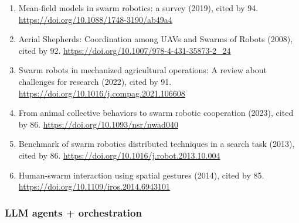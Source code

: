 \documentclass[
]{article}
\begin{document}
\begin{enumerate}
  Interaction with Foraging Swarms (2013), cited by 104.
  \url{https://doi.org/10.5898/jhri.2.2.kolling}
\item
  Mean-field models in swarm robotics: a survey (2019), cited by 94.
  \url{https://doi.org/10.1088/1748-3190/ab49a4}
\item
  Aerial Shepherds: Coordination among UAVs and Swarms of Robots (2008),
  cited by 92. \url{https://doi.org/10.1007/978-4-431-35873-2_24}
\item
  Swarm robots in mechanized agricultural operations: A review about
  challenges for research (2022), cited by 91.
  \url{https://doi.org/10.1016/j.compag.2021.106608}
\item
  From animal collective behaviors to swarm robotic cooperation (2023),
  cited by 86. \url{https://doi.org/10.1093/nsr/nwad040}
\item
  Benchmark of swarm robotics distributed techniques in a search task
  (2013), cited by 86. \url{https://doi.org/10.1016/j.robot.2013.10.004}
\item
  Human-swarm interaction using spatial gestures (2014), cited by 85.
  \url{https://doi.org/10.1109/iros.2014.6943101}
\end{enumerate}

\hypertarget{llm-agents-orchestration}{%
\subsubsection{LLM agents +
orchestration}\label{llm-agents-orchestration}}
\end{document}
